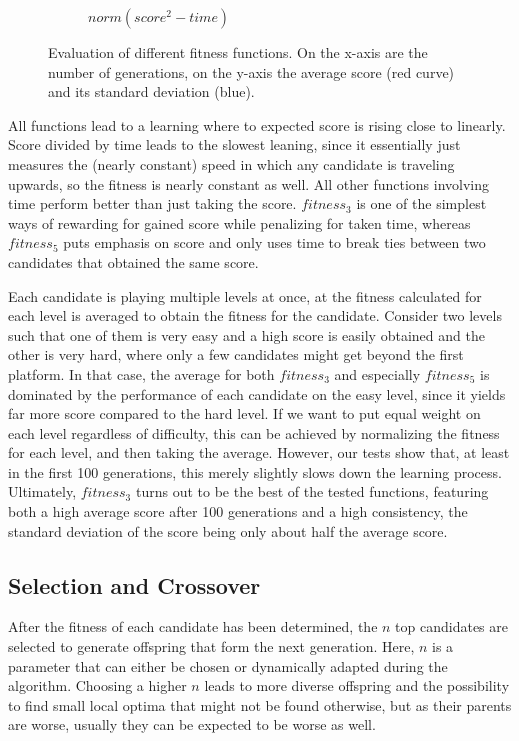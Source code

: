 \documentclass[a4paper,12pt,pagesize,headsepline,bibtotoc,titlepage,abstracton]{scrartcl}
\begin{document}
\begin{figure}[hbp]
\begin{center}
\begin{subfigure}[b]{0.45\textwidth}
    \caption{$norm(score^2 - time)$}
\end{subfigure}
\caption{Evaluation of different fitness functions. On the x-axis are the number of generations, on the y-axis the average score (red curve) and its standard deviation (blue).}
\label{fig:fitness}
\end{center}
\end{figure}

All functions lead to a learning where to expected score is rising close to linearly. Score divided by time leads to the slowest leaning, since it essentially just measures the (nearly constant) speed in which any candidate is traveling upwards, so the fitness is nearly constant as well. All other functions involving time perform better than just taking the score. $fitness_3$ is one of the simplest ways of rewarding for gained score while penalizing for taken time, whereas $fitness_5$ puts emphasis on score and only uses time to break ties between two candidates that obtained the same score. 

Each candidate is playing multiple levels at once, at the fitness calculated for each level is averaged to obtain the fitness for the candidate. Consider two levels such that one of them is very easy and a high score is easily obtained and the other is very hard, where only a few candidates might get beyond the first platform. In that case, the average for both $fitness_3$ and especially $fitness_5$ is dominated by the performance of each candidate on the easy level, since it yields far more score compared to the hard level. If we want to put equal weight on each level regardless of difficulty, this can be achieved by normalizing the fitness for each level, and then taking the average. However, our tests show that, at least in the first 100 generations, this merely slightly slows down the learning process. Ultimately, $fitness_3$ turns out to be the best of the tested functions, featuring both a high average score after 100 generations and a high consistency, the standard deviation of the score being only about half the average score.

\subsection{Selection and Crossover}

After the fitness of each candidate has been determined, the $n$ top candidates are selected to generate offspring that form the next generation. Here, $n$ is a parameter that can either be chosen or dynamically adapted during the algorithm. Choosing a higher $n$ leads to more diverse offspring and the possibility to find small local optima that might not be found otherwise, but as their parents are worse, usually they can be expected to be worse as well.
\end{document}
